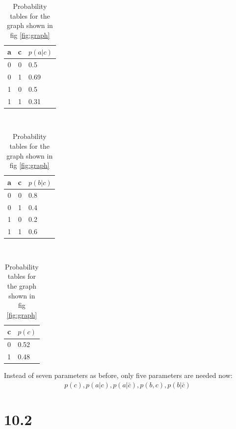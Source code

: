 \documentclass[a4paper,11pt]{article}
\theoremstyle{definition}
\theoremstyle{plain}
\theoremstyle{remark}
\begin{document}
\begin{table}
\centering
\caption{Probability tables for the graph shown in fig \ref{fig:graph}}
\begin{tabular}{|c|c|l|}
\hline
a & c & $p(a|c)$ \\ \hline
0 & 0 & 0.5 \\ \hline
0 & 1 & 0.69 \\ \hline
1 & 0 & 0.5 \\ \hline
1 & 1 & 0.31 \\ \hline
\end{tabular}
~
\begin{tabular}{|c|c|l|}
\hline
a & c & $p(b|c)$ \\ \hline
0 & 0 & 0.8 \\ \hline
0 & 1 & 0.4 \\ \hline
1 & 0 & 0.2 \\ \hline
1 & 1 & 0.6 \\ \hline
\end{tabular}
~
\begin{tabular}{|c|l|}
\hline
c & $p(c)$ \\ \hline
0 & 0.52 \\ \hline
1 & 0.48 \\ \hline
\end{tabular}
\end{table}
Instead of seven parameters as before, only five parameters are needed now:
\begin{align}
p(c), p(a|c), p(a|\bar{c}), p(b,c), p(b|\bar{c})
\end{align}

\section*{10.2}
\end{document}
